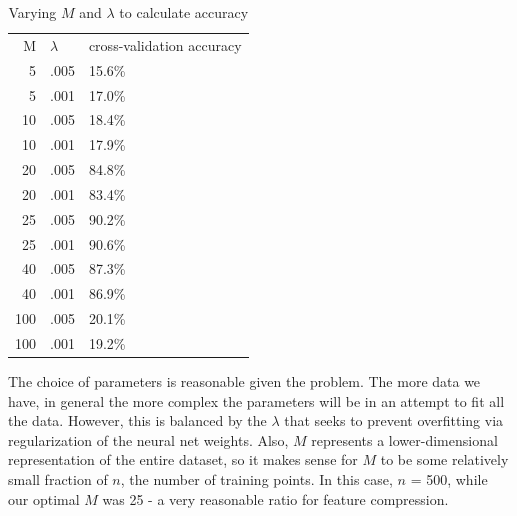 \documentclass[11pt,letterpaper]{article}
\begin{document}
\begin{table}[!htb]
\centering
\caption{Varying $M$ and $\lambda$ to calculate accuracy}
\label{my-label}
\begin{tabular}{rll}
M   & $\lambda$ & cross-validation accuracy \\
5   & .005    & 15.6\%   \\
5   & .001    & 17.0\%   \\
10  & .005    & 18.4\%   \\
10  & .001    & 17.9\%   \\
20  & .005    & 84.8\%   \\
20  & .001    & 83.4\%   \\
25  & .005    & 90.2\%   \\
25  & .001    & 90.6\%   \\
40  & .005    & 87.3\%   \\
40  & .001    & 86.9\%   \\
100 & .005    & 20.1\%   \\
100 & .001    & 19.2\%  
\end{tabular}
\end{table}

\pagebreak
\pagebreak

The choice of parameters is reasonable given the problem. The more data we have, in general the more complex the parameters will be in an attempt to fit all the data. However, this is balanced by the $\lambda$ that seeks to prevent overfitting via regularization of the neural net weights. Also, $M$ represents a lower-dimensional representation of the entire dataset, so it makes sense for $M$ to be some relatively small fraction of $n$, the number of training points. In this case, $n$ = 500, while our optimal $M$ was 25 - a very reasonable ratio for feature compression.
\end{document}
